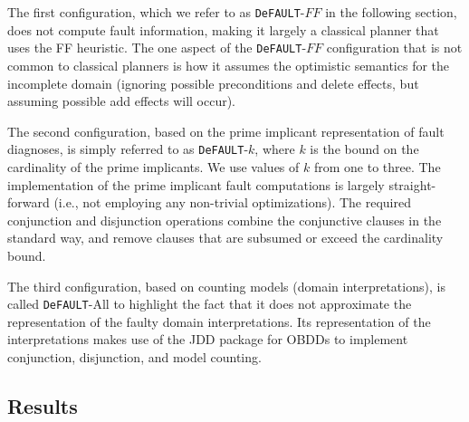 \documentclass{article}
\def\FFRISKY{{\tt DeFAULT}}
\begin{document}
The first configuration, which we refer to as \FFRISKY{}-$FF$ in the following section, does not compute fault information, making it largely a classical planner that uses the FF heuristic.  The one aspect of the \FFRISKY{}-$FF$ configuration that is not common to classical planners is how it assumes the optimistic semantics for the incomplete domain (ignoring possible preconditions and delete effects, but assuming possible add effects will occur).  

The second configuration, based on the prime implicant representation of fault diagnoses, is simply referred to as \FFRISKY{}-$k$, where $k$ is the bound on the cardinality of the prime implicants.  We use values of $k$ from one to three.  The implementation of the prime implicant fault computations is largely straight-forward (i.e., not employing any non-trivial optimizations).  The required conjunction and disjunction operations combine the conjunctive clauses in the standard way, and remove clauses that are subsumed or exceed the cardinality bound.

The third configuration, based on counting models (domain interpretations), is called \FFRISKY{}-All to highlight the fact that it does not approximate the representation of the faulty domain interpretations.  Its representation of the interpretations makes use of the JDD \cite{jdd} package for OBDDs to implement conjunction, disjunction, and model counting.


\subsection{Results}
\end{document}
